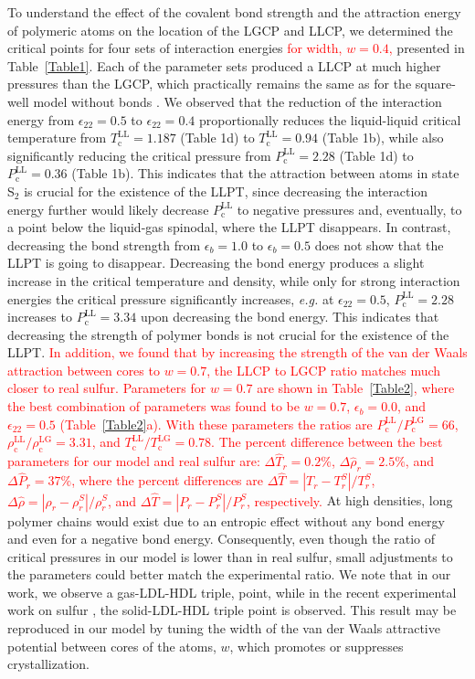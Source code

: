 \documentclass[9pt,twocolumn,twoside,lineno]{pnas-new}
\newcommand{\red}[1]{\textcolor{red}{#1}}
\begin{document}
To understand the effect of the covalent bond strength and the attraction energy of polymeric atoms on the location of the LGCP and LLCP, we determined the critical points for four sets of interaction energies \red{for width, $w=0.4$,} presented in Table~\ref{Table1}. Each of the parameter sets produced a LLCP at much higher pressures than the LGCP, which practically remains the same as for the square-well model without bonds \cite{Skibinsky2004}. We observed that the reduction of the interaction energy from $\epsilon_{22}=0.5$ to $\epsilon_{22}=0.4$ proportionally reduces the liquid-liquid critical temperature from $T_\text{c}^\text{LL}=1.187$ (Table 1d) to $T_\text{c}^\text{LL}=0.94$ (Table 1b), while also significantly reducing the critical pressure from $P_\text{c}^\text{LL}=2.28$ (Table 1d) to $P_\text{c}^\text{LL}=0.36$ (Table 1b). This indicates that the attraction between atoms in state S$_2$ is crucial for the existence of the LLPT, since decreasing the interaction energy further would likely decrease $P_\text{c}^\text{LL}$ to negative pressures and, eventually, to a point below the liquid-gas spinodal, where the LLPT disappears. In contrast, decreasing the bond strength from $\epsilon_b = 1.0$ to $\epsilon_b=0.5$ does not show that the LLPT is going to disappear. Decreasing the bond energy produces a slight increase in the critical temperature and density, while only for strong interaction energies the critical pressure significantly increases, \textit{e.g.} at $\epsilon_{22}=0.5$, $P_\text{c}^\text{LL} = 2.28$ increases to $P_\text{c}^\text{LL} = 3.34$ upon decreasing the bond energy. This indicates that decreasing the strength of polymer bonds is not crucial for the existence of the LLPT. \red{In addition, we found that by increasing the strength of the van der Waals attraction between cores to $w=0.7$, the LLCP to LGCP ratio matches much closer to real sulfur. Parameters for $w=0.7$ are shown in Table~\ref{Table2}, where the best combination of parameters was found to be $w = 0.7$, $\epsilon_b = 0.0$, and $\epsilon_{22}=0.5$ (Table~\ref{Table2}a). With these parameters the ratios are $P_\text{c}^\text{LL}/P_\text{c}^\text{LG}=66$, $\rho_\text{c}^\text{LL}/\rho_\text{c}^\text{LG}=3.31$, and $T_\text{c}^\text{LL}/T_\text{c}^\text{LG}=0.78$. The percent difference between the best parameters for our model and real sulfur are:  $\Delta \hat{T}_r = 0.2\%$, $\Delta \hat{\rho}_r = 2.5\%$, and $\Delta \hat{P}_r = 37\%$, where the percent differences are $\Delta\hat{T} = |T_r - T_r^S|/T_r^S$, $\Delta\hat{\rho} = |\rho_r - \rho_r^S|/\rho_r^S$, and $\Delta\hat{T} = |P_r - P_r^S|/P_r^S$, respectively.} At high densities, long polymer chains would exist due to an entropic effect without any bond energy and even for a negative bond energy. Consequently, even though the ratio of critical pressures in our model is lower than in real sulfur, small adjustments to the parameters could better match the experimental ratio. We note that in our work, we observe a gas-LDL-HDL triple, point, while in the recent experimental work on sulfur \cite{Henry2020}, the solid-LDL-HDL triple point is observed. This result may be reproduced in our model by tuning the width of the van der Waals attractive potential between cores of the atoms, $w$, which promotes or suppresses crystallization. 
\end{document}
